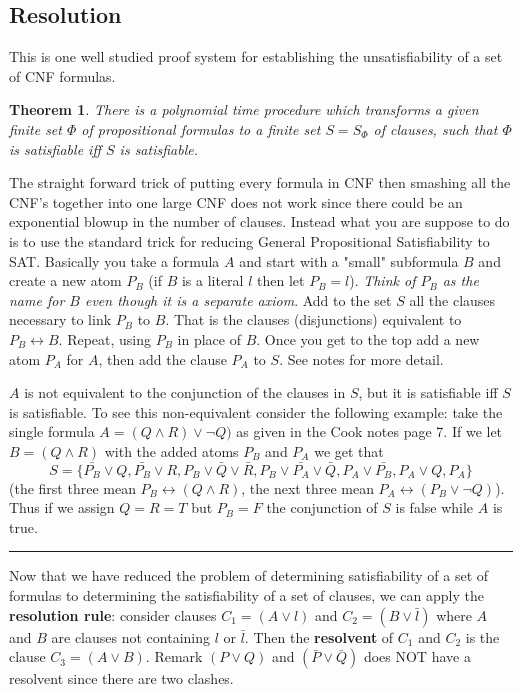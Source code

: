 \documentclass[twoside]{article}
\newcounter{lecnum}
\newtheorem{theorem}{Theorem}[lecnum]
\newenvironment{proof}{{\bf Proof:}}{\hfill\rule{2mm}{2mm}}
\begin{document}
\subsection{Resolution}
This is one well studied proof system for establishing the unsatisfiability of a set of CNF formulas. 

\begin{theorem}
There is a polynomial time procedure which transforms a given finite set $\Phi$ of propositional formulas to a finite set $S = S_{\Phi}$ of clauses, such that $\Phi$ is satisfiable iff $S$ is satisfiable. 
\end{theorem}
\begin{proof}
The straight forward trick of putting every formula in CNF then smashing all the CNF's together into one large CNF does not work since there could be an exponential blowup in the number of clauses. Instead what you are suppose to do is to use the standard trick for reducing General Propositional Satisfiability to SAT. Basically you take a formula $A$ and start with a "small" subformula $B$ and create a new atom $P_B$ (if $B$ is a literal $l$ then let $P_B = l$). \emph{Think of $P_B$ as the name for $B$ even though it is a separate axiom}. Add to the set $S$ all the clauses necessary to link $P_B$ to $B$. That is the clauses (disjunctions) equivalent to $P_B \longleftrightarrow B$. Repeat, using $P_B$ in place of $B$. Once you get to the top add a new atom $P_A$ for $A$, then add the clause $P_A$ to $S$. See notes for more detail. 

$A$ is not equivalent to the conjunction of the clauses in $S$, but it is satisfiable iff $S$ is satisfiable. To see this non-equivalent consider the following example: take the single formula $A = (Q \land R) \lor \lnot Q)$ as given in the Cook notes page 7. If we let $B = (Q \land R)$ with the added atoms $P_B$ and $P_A$ we get that
\[S = \{\bar{P_B}\lor Q, \bar{P_B} \lor R, P_B \lor \bar{Q}\lor \bar{R}, P_B \lor \bar{P_A} \lor \bar{Q}, P_A \lor \bar{P_B}, P_A \lor Q, P_A\}\]
(the first three mean $P_B \longleftrightarrow (Q \land R)$, the next three mean $P_A \longleftrightarrow (P_B \lor \lnot Q)$). Thus if we assign $Q = R = T$ but $P_B = F$ the conjunction of $S$ is false while $A$ is true.  
\end{proof} 

Now that we have reduced the problem of determining satisfiability of a set of formulas to determining the satisfiability of a set of clauses, we can apply the \textbf{resolution rule}: consider clauses $C_1 = (A \lor l)$ and $C_2 = (B \lor \bar{l})$ where $A$ and $B$ are clauses not containing $l$ or $\bar{l}$. Then the \textbf{resolvent} of $C_1$ and $C_2$ is the clause $C_3 = (A \lor B)$. Remark $(P \lor Q)$ and $(\bar{P} \lor \bar{Q})$ does NOT have a resolvent since there are two clashes.
\end{document}
